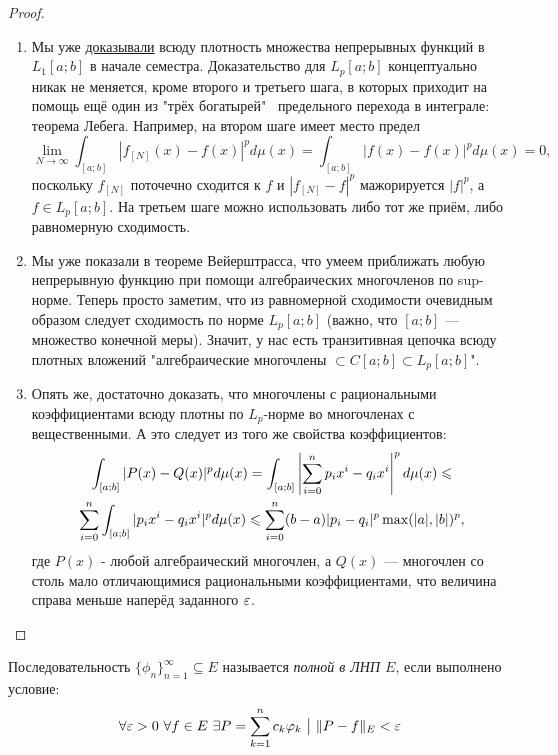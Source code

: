 \begin{proof}
	\begin{enumerate}
		\item
		Мы уже \hyperref[continuous_denseness]{доказывали} всюду плотность множества непрерывных функций в $L_1[a; b]$ в начале семестра. Доказательство для $L_p[a; b]$ концептуально никак не меняется, кроме второго и третьего шага, в которых приходит на помощь ещё один из "трёх богатырей" \ предельного перехода в интеграле: теорема Лебега. Например, на втором шаге имеет место предел
		\[
			\lim_{N \to \infty} \int_{[a; b]} |f_{[N]}(x) - f(x)|^p d\mu(x) = \int_{[a; b]} |f(x) - f(x)|^p d\mu(x) = 0, 
		\]
		поскольку $f_{[N]}$ поточечно сходится к $f$ и $|f_{[N]} - f|^p$ мажорируется $|f|^p$, а $f \in L_p[a; b]$. На третьем шаге можно использовать либо тот же приём, либо равномерную сходимость.
		\item
		Мы уже показали в теореме Вейерштрасса, что умеем приближать любую непрерывную функцию при помощи алгебраических многочленов по sup-норме. Теперь просто заметим, что из равномерной сходимости очевидным образом следует сходимость по норме $L_p[a; b]$ (важно, что $[a; b]$ --- множество конечной меры). Значит, у нас есть транзитивная цепочка всюду плотных вложений "алгебраические многочлены $\subset C[a;b] \subset L_p[a;b]$".
		\item
		Опять же, достаточно доказать, что многочлены с рациональными коэффициентами всюду плотны по $L_p$-норме во многочленах с вещественными. А это следует из того же свойства коэффициентов:
		\begin{multline*}
			\int_{[a; b]} |P(x) - Q(x)|^p d\mu(x) = \int_{[a; b]} \left|\sum_{i=0}^n p_ix^i - q_ix^i\right|^p d\mu(x) \leqslant \\ \sum_{i=0}^n \int_{[a; b]} |p_ix^i - q_ix^i|^p d\mu(x) \leqslant \sum_{i=0}^n (b-a)|p_i - q_i|^p \max(|a|, |b|)^p,
		\end{multline*}
		где $P(x)$ - любой алгебраический многочлен, а $Q(x)$ --- многочлен со столь мало отличающимися рациональными коэффициентами, что величина справа меньше наперёд заданного $\varepsilon$.
	\end{enumerate}
\end{proof}

\begin{definition}
	Последовательность $\{\phi_n\}_{n = 1}^\infty \subseteq E$ называется \textit{полной в ЛНП $E$}, если выполнено условие:
	\[
		\forall \varepsilon > 0\ \forall f \in E\ \exists P = \sum_{k = 1}^n c_k\varphi_k \ \big|\  \|P - f\|_E < \varepsilon
	\]
\end{definition}

